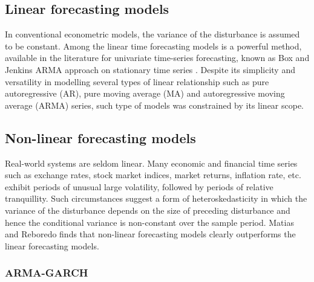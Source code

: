 \subsection{Linear forecasting models}

In conventional econometric models, the variance of the disturbance is assumed to be constant. Among the linear time forecasting models is a powerful method, available in the literature for univariate time-series forecasting, known as Box and Jenkins ARMA approach on stationary time series \cite{B&J}. Despite its simplicity and versatility in modelling several types of linear relationship such as pure autoregressive (AR), pure moving average (MA) and autoregressive moving average (ARMA) series, such type of models was constrained by its linear scope. 

\subsection{Non-linear forecasting models}

Real-world systems are seldom linear. Many economic and financial time series such as exchange rates, stock market indices, market returns, inflation rate, etc. exhibit periods of unusual large volatility, followed by periods of relative tranquillity. Such circumstances suggest a form of heteroskedasticity in which the variance of the disturbance depends on the size of preceding disturbance and hence the conditional variance is non-constant over the sample period. Matias and Reboredo \cite{M&R} finds that non-linear forecasting models clearly outperforms the linear forecasting models.

\subsubsection{ARMA-GARCH}

